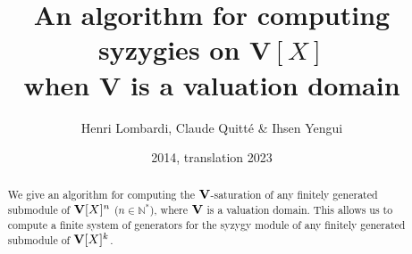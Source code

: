 

\begingroup




\def\proofname{\textsl{Proof}}




\title{An algorithm for computing syzygies on $\mathbf{V}[X]$\\
when $\mathbf{V}$ is a valuation domain}
\author{
Henri Lombardi,
Claude Quitté \& Ihsen Yengui
}

\date{2014, translation 2023}



\def\thefootnote{\arabic{footnote}}

\startcontents[english]







\newcommand\hum[1]{}












\maketitle



\begin{abstract}
\smallskip
We give an algorithm for computing the $\mathbf{V}$-saturation of any finitely
generated submodule of $\mathbf{V}[X]^n$ ($n \in \mathbb{N}^*$),
where $\mathbf{V}$ is a valuation domain. This allows us to compute a finite
system of generators for the syzygy module of any finitely generated
submodule of $\mathbf{V}[X]^k$.
\end{abstract}



\setcounter{tocdepth}{4}
\small

\normalsize


\pagestyle{myheadings} 


